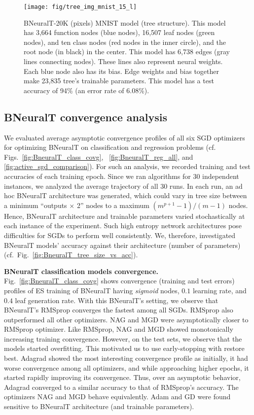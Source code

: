 \documentclass[11pt,a4paper]{article}
\begin{document}
   	\begin{figure}
   		\centering
   		\texttt{[image: fig/tree\_img\_mnist\_15\_l]}
   		\caption{BNeuralT-20K (pixels) MNIST model (tree structure). This model has 3,664 function nodes (blue nodes), 16,507 leaf nodes (green nodes), and ten class nodes (red nodes in the inner circle), and the root node (in black) in the center. This model has 6,738 edges (gray lines connecting nodes). These lines also represent neural weights. Each blue node also has its bias. Edge weights and bias together make 23,835 tree's trainable parameters. This model has a test accuracy of 94\% (an error rate of 6.08\%).
   		\label{fig:tree_img_mnist}}


   	\end{figure}
    
    \subsection{BNeuralT convergence analysis}
    \label{sec:BNeuralT_covergence}
We evaluated average asymptotic convergence profiles of all six SGD optimizers for optimizing BNeuralT on classification and regression problems (cf. Figs.~\ref{fig:BneuralT_class_covg},  ~\ref{fig:BneuralT_reg_all}, and \ref{fig:active_sgd_comparison}). For such an analysis, we recorded training and test accuracies of each training epoch. Since we ran algorithms for 30 independent instances, we analyzed the average trajectory of all 30 runs. In each run, an ad hoc BNeuralT architecture was generated, which could vary  in tree size between a minimum ``outputs $\times$ 2'' nodes to a maximum $(m^{p+1} - 1)/(m-1)$ nodes. Hence, BNeuralT architecture and trainable parameters varied stochastically at each instance of the experiment. Such high entropy network architectures pose difficulties for SGDs to perform well consistently. We, therefore, investigated BNeuralT models' accuracy against their architecture (number of parameters) (cf.~Fig.~\ref{fig:BneuralT_tree_size_vs_acc}).
    
    \textbf{BNeuralT classification models convergence.} Fig.~\ref{fig:BneuralT_class_covg} shows convergence (training and test errors) profiles of ES training of BNeuralT having \textit{sigmoid} nodes, $0.1$ learning rate, and $0.4$ leaf generation rate. With this BNeuralT's setting, we observe that BNeuralT's RMSprop converges the fastest among all SGDs. RMSprop also outperformed all other optimizers. NAG and MGD were asymptotically closer to RMSprop optimizer. Like RMSprop, NAG and MGD showed monotonically increasing training convergence. However, on the test sets, we observe that the models started overfitting.  This motivated us to use early-stopping with restore best. Adagrad showed the most interesting convergence profile as initially, it had worse convergence among all optimizers, and while approaching higher epochs, it started rapidly improving its convergence. Thus, over an asymptotic behavior, Adagrad converged to a similar accuracy to that of RMSprop's accuracy. The optimizers NAG and MGD behave equivalently. Adam and GD were found sensitive to BNeuralT architecture (and trainable parameters).
    
\end{document}
